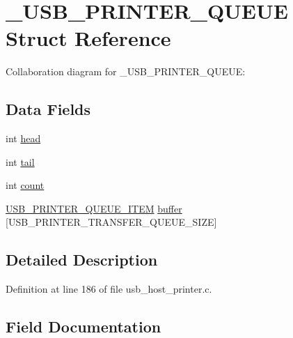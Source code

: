 \hypertarget{struct___u_s_b___p_r_i_n_t_e_r___q_u_e_u_e}{}\section{\+\_\+\+U\+S\+B\+\_\+\+P\+R\+I\+N\+T\+E\+R\+\_\+\+Q\+U\+E\+U\+E Struct Reference}
\label{struct___u_s_b___p_r_i_n_t_e_r___q_u_e_u_e}


Collaboration diagram for \+\_\+\+U\+S\+B\+\_\+\+P\+R\+I\+N\+T\+E\+R\+\_\+\+Q\+U\+E\+U\+E\+:
\subsection*{Data Fields}
\begin{DoxyCompactItemize}
\item 
int \hyperlink{struct___u_s_b___p_r_i_n_t_e_r___q_u_e_u_e_a20358970b1abaf992eb85e071e454653}{head}
\item 
int \hyperlink{struct___u_s_b___p_r_i_n_t_e_r___q_u_e_u_e_aff39d864a6594bc5f4a5e365282e00fe}{tail}
\item 
int \hyperlink{struct___u_s_b___p_r_i_n_t_e_r___q_u_e_u_e_ad43c3812e6d13e0518d9f8b8f463ffcf}{count}
\item 
\hyperlink{usb__host__printer_8c_aa65bc8f707c4b3884cbe053344100bfe}{U\+S\+B\+\_\+\+P\+R\+I\+N\+T\+E\+R\+\_\+\+Q\+U\+E\+U\+E\+\_\+\+I\+T\+E\+M} \hyperlink{struct___u_s_b___p_r_i_n_t_e_r___q_u_e_u_e_acd6bca70edbcbdcee2593421d0fbdd2b}{buffer} \mbox{[}U\+S\+B\+\_\+\+P\+R\+I\+N\+T\+E\+R\+\_\+\+T\+R\+A\+N\+S\+F\+E\+R\+\_\+\+Q\+U\+E\+U\+E\+\_\+\+S\+I\+Z\+E\mbox{]}
\end{DoxyCompactItemize}


\subsection{Detailed Description}


Definition at line 186 of file usb\+\_\+host\+\_\+printer.\+c.



\subsection{Field Documentation}
\hypertarget{struct___u_s_b___p_r_i_n_t_e_r___q_u_e_u_e_acd6bca70edbcbdcee2593421d0fbdd2b}{}
